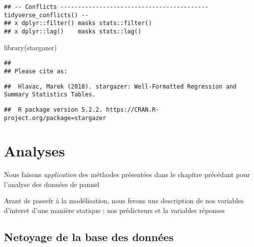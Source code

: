 \documentclass[
]{book}
\newenvironment{Shaded}{\begin{snugshade}}{\end{snugshade}}
\newcommand{\AttributeTok}[1]{\textcolor[rgb]{0.77,0.63,0.00}{#1}}
\newcommand{\ConstantTok}[1]{\textcolor[rgb]{0.00,0.00,0.00}{#1}}
\newcommand{\FunctionTok}[1]{\textcolor[rgb]{0.00,0.00,0.00}{#1}}
\newcommand{\NormalTok}[1]{#1}
\newcommand{\SpecialCharTok}[1]{\textcolor[rgb]{0.00,0.00,0.00}{#1}}
\begin{document}
\begin{verbatim}
## -- Conflicts ------------------------------------------ tidyverse_conflicts() --
## x dplyr::filter() masks stats::filter()
## x dplyr::lag()    masks stats::lag()
\end{verbatim}

\begin{Shaded}
\begin{Highlighting}[]
\FunctionTok{library}\NormalTok{(stargazer)}
\end{Highlighting}
\end{Shaded}

\begin{verbatim}
## 
## Please cite as:
\end{verbatim}

\begin{verbatim}
##  Hlavac, Marek (2018). stargazer: Well-Formatted Regression and Summary Statistics Tables.
\end{verbatim}

\begin{verbatim}
##  R package version 5.2.2. https://CRAN.R-project.org/package=stargazer
\end{verbatim}

\hypertarget{analyses}{%
\chapter{Analyses}\label{analyses}}

Nous faisons \emph{application} des méthodes présentées dans le chapitre précédant pour l'analyse des données de pannel

Avant de passefr à la modélisation, nous ferons une description de nos variables d'interet d'une manière statique : nos prédicteurs et la variables réponses

\hypertarget{netoyage-de-la-base-des-donnuxe9es}{%
\section{Netoyage de la base des données}\label{netoyage-de-la-base-des-donnuxe9es}}

\begin{Shaded}
\end{Shaded}
\end{document}
